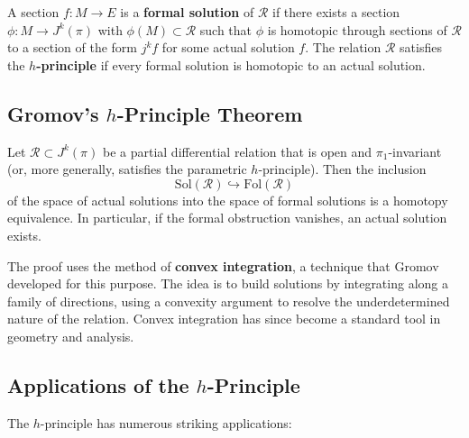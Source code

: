 \begin{definition}
A section \(f: M \to E\) is a \textbf{formal solution} of \(\mathcal{R}\) if there exists a section \(\phi: M \to J^k(\pi)\) with \(\phi(M) \subset \mathcal{R}\) such that \(\phi\) is homotopic through sections of \(\mathcal{R}\) to a section of the form \(j^k f\) for some actual solution \(f\). The relation \(\mathcal{R}\) satisfies the \textbf{\(h\)-principle} if every formal solution is homotopic to an actual solution.
\end{definition}

\subsection{Gromov's \texorpdfstring{\(h\)}{h}-Principle Theorem}

\begin{theorem}
Let \(\mathcal{R} \subset J^k(\pi)\) be a partial differential relation that is open and \(\pi_1\)-invariant (or, more generally, satisfies the parametric \(h\)-principle). Then the inclusion
\[
\text{Sol}(\mathcal{R}) \hookrightarrow \text{Fol}(\mathcal{R})
\]
of the space of actual solutions into the space of formal solutions is a homotopy equivalence. In particular, if the formal obstruction vanishes, an actual solution exists.
\end{theorem}

The proof uses the method of \textbf{convex integration}, a technique that Gromov developed for this purpose. The idea is to build solutions by integrating along a family of directions, using a convexity argument to resolve the underdetermined nature of the relation. Convex integration has since become a standard tool in geometry and analysis.

\subsection{Applications of the \texorpdfstring{\(h\)}{h}-Principle}

The \(h\)-principle has numerous striking applications:

